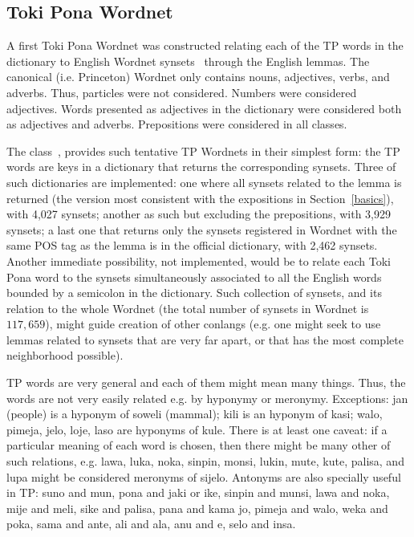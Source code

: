 \subsection{Toki Pona Wordnet}\label{wn}
A first Toki Pona Wordnet was constructed
relating each of the TP words in the dictionary
to English Wordnet synsets~\cite{wordnet}
through the English lemmas.
The canonical (i.e. Princeton) Wordnet only contains nouns,
adjectives, verbs, and adverbs.
Thus, particles were not considered.
Numbers were considered adjectives.
Words presented as adjectives in the dictionary
were considered both as adjectives and adverbs.
Prepositions were considered in all classes.~\cite{wordnet}

The  class~\cite{tokipona},
provides such tentative TP Wordnets in their simplest form:
the TP words are keys in a dictionary that returns the
corresponding synsets.
Three of such dictionaries are implemented:
one where all synsets related to the lemma is
returned (the version most consistent
with the expositions in Section~\ref{basics}),
with 4,027 synsets;
another as such but excluding the prepositions,
with 3,929 synsets;
a last one that returns only the synsets
registered in Wordnet with the same POS tag as the lemma
is in the official dictionary,
with 2,462 synsets. 
Another immediate possibility, not implemented,
would be to relate each Toki Pona word to the synsets
simultaneously associated to all the English
words bounded by a semicolon in the dictionary.
Such collection of synsets, and its relation to the whole
Wordnet
(the total number of synsets in Wordnet is $117,659$),
might guide creation of other conlangs
(e.g. one might seek to use lemmas related to synsets that
are very far apart, or that has the most complete neighborhood
possible).

TP words are very general
and each of them might mean many things.
Thus, the words are not very easily related e.g. by hyponymy
or meronymy.
Exceptions: jan (people) is a hyponym of soweli (mammal);
kili is an hyponym of kasi;
walo, pimeja, jelo, loje, laso
are hyponyms of kule.
There is at least one caveat:
if a particular meaning of each word is chosen,
then there might be many other of such relations,
e.g. 
  lawa, luka, noka, sinpin, monsi, lukin, mute, kute, palisa, and lupa
  might be considered meronyms of sijelo.
  Antonyms are also specially useful in TP: suno and mun, pona and jaki or ike, sinpin and munsi, lawa and noka, mije and meli, sike and palisa, pana and kama jo, pimeja and walo, weka and poka, sama and ante, ali and ala, anu and e, selo and insa. 

